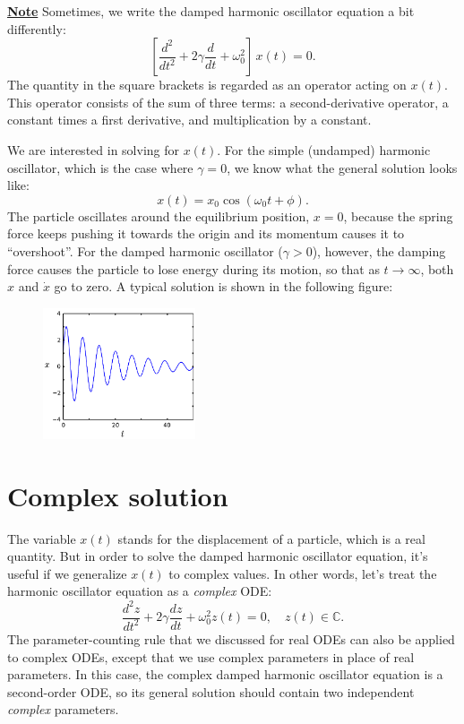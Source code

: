 \documentclass[10pt,a4paper]{article}
\begin{document}
\begin{framed}
\noindent
\underline{\textbf{Note}}
\vskip 0.1in \noindent
Sometimes, we write the damped harmonic oscillator equation a bit
differently:
\begin{equation}
\left[\frac{d^2}{dt^2} + 2\gamma \frac{d}{dt} + \omega_0^2 \right]\, x(t) = 0.
\end{equation}The
quantity in the square brackets is regarded as an operator acting on
$x(t)$. This operator consists of the sum of three terms: a
second-derivative operator, a constant times a first derivative, and
multiplication by a constant.
\end{framed}

We are interested in solving for $x(t)$.  For the simple (undamped)
harmonic oscillator, which is the case where $\gamma = 0$, we know
what the general solution looks like:
\begin{equation}
  x(t) = x_0 \cos(\omega_0 t + \phi).
\end{equation}
The particle oscillates around the equilibrium position, $x = 0$,
because the spring force keeps pushing it towards the origin and its
momentum causes it to ``overshoot''.  For the damped harmonic
oscillator ($\gamma > 0$), however, the damping force causes the
particle to lose energy during its motion, so that as $t \rightarrow
\infty$, both $x$ and $\dot{x}$ go to zero.  A typical solution is
shown in the following figure:

\begin{figure}[h]
  \centering\includegraphics[width=0.4\textwidth]{damped_oscillator_motion}
\end{figure}

\section{Complex solution}
\label{complex-solution}

The variable $x(t)$ stands for the displacement of a particle, which
is a real quantity. But in order to solve the damped harmonic
oscillator equation, it's useful if we generalize $x(t)$ to complex
values. In other words, let's treat the harmonic oscillator equation
as a \emph{complex} ODE:
\begin{equation}
\frac{d^2 z}{dt^2} + 2\gamma \frac{dz}{dt} + \omega_0^2 z(t) = 0, \quad z(t) \in \mathbb{C}.
\label{zode}
\end{equation}
The parameter-counting rule that we discussed for real ODEs can also
be applied to complex ODEs, except that we use complex parameters in
place of real parameters. In this case, the complex damped harmonic
oscillator equation is a second-order ODE, so its general solution
should contain two independent \emph{complex} parameters.
\end{document}
